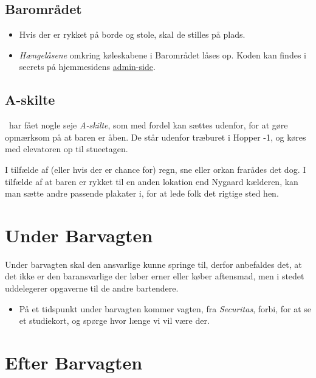 \subsection{Barområdet}
\label{sec:pre:baromradet}

\begin{itemize}
    \item Hvis der er rykket på borde og stole, skal de stilles på plads.
    \item \textit{Hængelåsene} omkring køleskabene i Barområdet låses op.
    Koden kan findes i secrets på hjemmesidens \href{https://fredagscafeen.dk/admin/admin/secrets/}{admin-side}.
\end{itemize}

\subsection{A-skilte}
\label{sec:pre:a-skilte}
\fredagscafeen\ har fået nogle seje \textit{A-skilte},
som med fordel kan sættes udenfor,
for at gøre opmærksom på at baren er åben.
De står udenfor træburet i Hopper -1, og
køres med elevatoren op til stueetagen.

I tilfælde af (eller hvis der er chance for) regn, sne eller orkan
frarådes det dog.
I tilfælde af at baren er rykket til en anden lokation end Nygaard kælderen,
kan man sætte andre passende plakater i, for at lede folk det rigtige sted hen.

\section{Under Barvagten}
\label{sec:intra-barvagten}
Under barvagten skal den ansvarlige kunne springe til,
derfor anbefaldes det, at det ikke er den baransvarlige
der løber erner eller køber aftensmad, men i stedet uddelegerer
opgaverne til de andre bartendere.
\begin{itemize}
    \item På et tidspunkt under barvagten kommer vagten, fra \textit{Securitas}, forbi,
    for at se et studiekort, og spørge hvor længe vi vil være der.
\end{itemize}

\section{Efter Barvagten}
\label{sec:post-barvagten}

